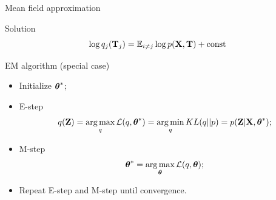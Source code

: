 \begin{frame}{Mean field approximation}
    \begin{block}{Solution}
    \[
        \log q_j(\mathbf{T}_j) = \mathbb{E}_{i \neq j} \log p(\mathbf{X}, \mathbf{T}) + \text{const}
    \]
    \end{block}

	\begin{block}{EM algorithm (special case)}
	\begin{itemize}
		\item Initialize $\boldsymbol{\theta}^*$;
		\item E-step
		\[
			q(\mathbf{Z}) = \operatorname*{arg\,max}_q \mathcal{L} (q, \boldsymbol{\theta}^*) = \operatorname*{arg\,min}_q KL(q || p) =
			 p(\mathbf{Z}| \mathbf{X}, \boldsymbol{\theta}^*);
		\]
		\item M-step
		\[
			\boldsymbol{\theta}^* = \operatorname*{arg\,max}_{\boldsymbol{\theta}} \mathcal{L} (q, \boldsymbol{\theta});
		\]
		\item Repeat E-step and M-step until convergence.
	\end{itemize}
	\end{block}
\end{frame}
